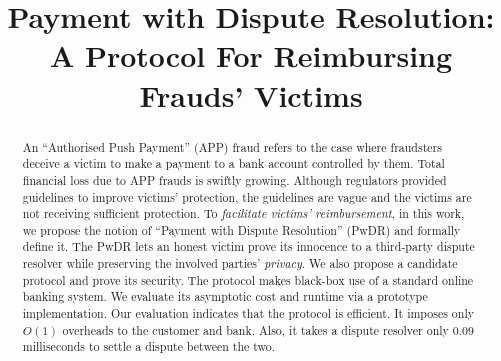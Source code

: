 \documentclass[orivec]{llncs}
\begin{document}
\title{Payment with Dispute Resolution: \\ A Protocol For Reimbursing  Frauds' Victims}
\author{}
\institute{}

\date{}
\maketitle{}


\begin{abstract}
An ``Authorised Push Payment'' (APP) fraud refers to the case where  fraudsters deceive a victim  to make  a payment  to a bank account controlled by them.  Total financial loss due to  APP frauds is swiftly growing. Although  regulators   provided guidelines to  improve victims’ protection, the guidelines are  vague and  the victims are not receiving sufficient protection. To  \emph{facilitate    victims' reimbursement}, in this work, we propose the notion of ``Payment with Dispute Resolution'' (PwDR) and formally define it. The PwDR lets an honest victim  prove its innocence to a third-party dispute resolver  while preserving the involved parties' \emph{privacy}. We also propose a  candidate protocol  and  prove its security. The protocol  makes black-box use of a standard online banking system. We evaluate its    asymptotic cost and   runtime  via a prototype implementation. Our evaluation indicates that the protocol is  efficient. It imposes only $O(1)$ overheads to the customer and bank.  Also, it takes  a dispute resolver  only $0.09$ milliseconds to  settle a dispute between the two.
\end{abstract}












\appendix






\end{document}
